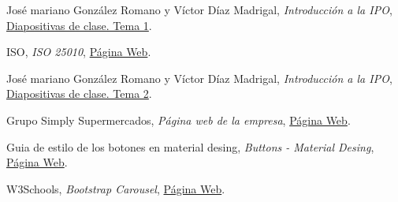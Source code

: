 \documentclass[a4paper,11pt]{article}
\begin{document}
\begin{thebibliography}{99}
  José mariano González Romano y Víctor Díaz Madrigal,
  \textit{Introducción a la IPO},
  \href{https://s3-eu-central-1.amazonaws.com/learn-eu-central-1-prod-fleet01-xythos/5ac734ed505df/1497177?response-content-disposition=inline%3B%20filename%2A%3DUTF-8%27%27IPO-2018-19-01-Introducci%25C3%25B3n%2520a%2520la%2520IPO.pdf&response-content-type=application%2Fpdf&X-Amz-Algorithm=AWS4-HMAC-SHA256&X-Amz-Date=20181009T201303Z&X-Amz-SignedHeaders=host&X-Amz-Expires=21600&X-Amz-Credential=AKIAIZ3QX2YUHH4EOO3A%2F20181009%2Feu-central-1%2Fs3%2Faws4_request&X-Amz-Signature=91e59768c9f86b77180953691bdcae19f7300073d4ad74d0949de1515d0b6f55}{Diapositivas de clase. Tema 1}.

ISO,
\textit{ISO 25010},
\href{https://iso25000.com/index.php/normas-iso-25000/iso-25010/23-usabilidad}{Página Web}.

José mariano González Romano y Víctor Díaz Madrigal,
\textit{Introducción a la IPO},
\href{https://s3-eu-central-1.amazonaws.com/learn-eu-central-1-prod-fleet01-xythos/5ac734ed505df/1548262?response-content-disposition=inline%3B%20filename%2A%3DUTF-8%27%27IPO-2018-19-02-Usabilidad.pdf&response-content-type=application%2Fpdf&X-Amz-Algorithm=AWS4-HMAC-SHA256&X-Amz-Date=20181009T201947Z&X-Amz-SignedHeaders=host&X-Amz-Expires=21600&X-Amz-Credential=AKIAIZ3QX2YUHH4EOO3A%2F20181009%2Feu-central-1%2Fs3%2Faws4_request&X-Amz-Signature=b0015ef5189a68a14076abd0ef07c9f15c07aa1ef5bebf8a545bf456bbfafe84}{Diapositivas de clase. Tema 2}.

Grupo Simply Supermercados,
\textit{Página web de la empresa},
\href{www.simply.es}{Página Web}.

Guia de estilo de los botones en material desing,
\textit{Buttons - Material Desing},
\href{https://material.io/design/components/buttons.html}{Página Web}.

W3Schools,
\textit{Bootstrap Carousel},
\href{https://www.w3schools.com/bootstrap/bootstrap_carousel.asp}{Página Web}.

\end{thebibliography}
\end{document}

